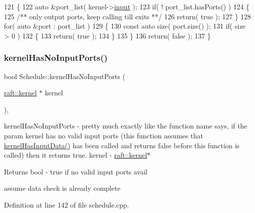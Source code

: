 \begin{DoxyCode}
121 \{
122    \textcolor{keyword}{auto} &port\_list( kernel->\hyperlink{classraft_1_1kernel_a6edbe35a56409d402e719b3ac36d6554}{input} );
123    \textcolor{keywordflow}{if}( ! port\_list.hasPorts() )
124    \{\textcolor{comment}{}
125 \textcolor{comment}{      /** only output ports, keep calling till exits **/}
126       \textcolor{keywordflow}{return}( \textcolor{keyword}{true} );
127    \}
128    \textcolor{keywordflow}{for}( \textcolor{keyword}{auto} &port : port\_list )
129    \{
130       \textcolor{keyword}{const} \textcolor{keyword}{auto} size( port.size() );
131       \textcolor{keywordflow}{if}( size > 0 )
132       \{
133          \textcolor{keywordflow}{return}( \textcolor{keyword}{true} );
134       \}
135    \}
136    \textcolor{keywordflow}{return}( \textcolor{keyword}{false} );
137 \}
\end{DoxyCode}
\hypertarget{class_schedule_a2e2035e0c0666054f8401ad2b3792854}{}\label{class_schedule_a2e2035e0c0666054f8401ad2b3792854} 
\subsubsection{\texorpdfstring{kernel\+Has\+No\+Input\+Ports()}{kernelHasNoInputPorts()}}
{\footnotesize\ttfamily bool Schedule\+::kernel\+Has\+No\+Input\+Ports (\begin{DoxyParamCaption}\item[{\hyperlink{classraft_1_1kernel}{raft\+::kernel} $\ast$}]{kernel }\end{DoxyParamCaption})\hspace{0.3cm}{\ttfamily [static]}, {\ttfamily [protected]}}

kernel\+Has\+No\+Input\+Ports -\/ pretty much exactly like the function name says, if the param kernel has no valid input ports (this function assumes that \hyperlink{class_schedule_ac23de3dd63554401fd0d8d23b60eecfa}{kernel\+Has\+Input\+Data()} has been called and returns false before this function is called) then it returns true.  kernel -\/ \hyperlink{classraft_1_1kernel}{raft\+::kernel}$\ast$ \begin{DoxyReturn}{Returns}
bool -\/ true if no valid input ports avail 
\end{DoxyReturn}
assume data check is already complete 

Definition at line 142 of file schedule.\+cpp.



